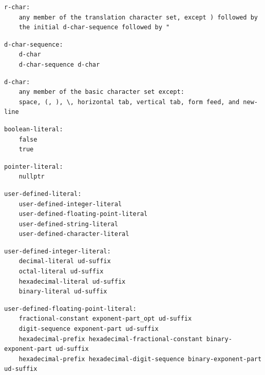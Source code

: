 \noindent\textbf{\texttt{}}\par
\begin{lstlisting}
r-char:
    any member of the translation character set, except ) followed by
    the initial d-char-sequence followed by "
\end{lstlisting}

\noindent\textbf{\texttt{}}\par
\begin{lstlisting}
d-char-sequence:
    d-char
    d-char-sequence d-char
\end{lstlisting}

\noindent\textbf{\texttt{}}\par
\begin{lstlisting}
d-char:
    any member of the basic character set except:
    space, (, ), \, horizontal tab, vertical tab, form feed, and new-line
\end{lstlisting}

\noindent\textbf{\texttt{}}\par
\begin{lstlisting}
boolean-literal:
    false
    true
\end{lstlisting}

\noindent\textbf{\texttt{}}\par
\begin{lstlisting}
pointer-literal:
    nullptr
\end{lstlisting}

\noindent\textbf{\texttt{}}\par
\begin{lstlisting}
user-defined-literal:
    user-defined-integer-literal
    user-defined-floating-point-literal
    user-defined-string-literal
    user-defined-character-literal
\end{lstlisting}

\noindent\textbf{\texttt{}}\par
\begin{lstlisting}
user-defined-integer-literal:
    decimal-literal ud-suffix
    octal-literal ud-suffix
    hexadecimal-literal ud-suffix
    binary-literal ud-suffix
\end{lstlisting}

\noindent\textbf{\texttt{}}\par
\begin{lstlisting}
user-defined-floating-point-literal:
    fractional-constant exponent-part_opt ud-suffix
    digit-sequence exponent-part ud-suffix
    hexadecimal-prefix hexadecimal-fractional-constant binary-exponent-part ud-suffix
    hexadecimal-prefix hexadecimal-digit-sequence binary-exponent-part ud-suffix
\end{lstlisting}

